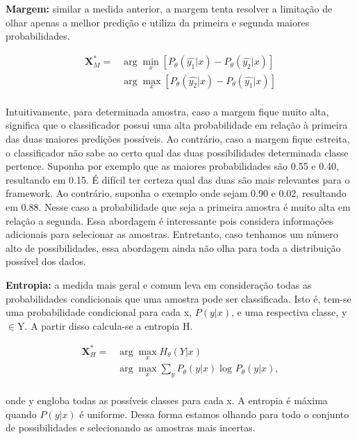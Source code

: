 \textbf{Margem:} similar a medida anterior, a margem tenta resolver a limitação de olhar apenas a melhor predição e utiliza da primeira e segunda maiores probabilidades. 


\begin{align*}
\textbf{X}^*_{M} = &\arg\min_{x}[ P_{\theta} (\hat{y_{1}}\lvert x) - P_{\theta} (\hat{y_{2}}\lvert x)]\\
&\arg\max_{x}[ P_{\theta} (\hat{y_{2}}\lvert x) - P_{\theta} (\hat{y_{1}}\lvert x)]\\
\end{align*}

Intuitivamente, para determinada amostra, caso a margem fique muito alta, significa que o classificador possui uma alta probabilidade em relação à primeira das duas maiores predições possíveis. Ao contrário, caso a margem fique estreita, o classificador não sabe ao certo qual das duas possibilidades determinada classe pertence. Suponha por exemplo que as maiores probabilidades são 0.55 e 0.40, resultando em 0.15. É difícil ter certeza qual das duas são mais relevantes para o framework. Ao contrário, suponha o exemplo onde sejam 0.90 e 0.02, resultando em 0.88. Nesse caso a probabilidade que seja a primeira amostra é muito alta em relação a segunda. Essa abordagem é interessante pois considera informações adicionais para selecionar as amostras. Entretanto, caso tenhamos um número alto de possibilidades, essa abordagem ainda não olha para toda a distribuição possível dos dados.

\textbf{Entropia:} a medida mais geral e comum leva em consideração todas as probabilidades condicionais que uma amostra pode ser classificada. Isto é, tem-se uma probabilidade condicional para cada x, $P(y\lvert x)$, e uma respectiva classe, y$\in$Y. A partir disso calcula-se a entropia H.

\begin{align*}
\textbf{X}^*_{H} = &\arg\max_{x} H_{\theta}  (Y\lvert x)\\
&\arg\max_{x} \sum_{y} P_{\theta}  (y\lvert x) \log_{} P_{\theta}  (y\lvert x),\\
\end{align*}

onde y engloba todas as possíveis classes para cada x. A entropia é máxima quando $P(y\lvert x)$ é uniforme. Dessa forma estamos olhando para todo o conjunto de possibilidades e selecionando as amostras mais incertas.


